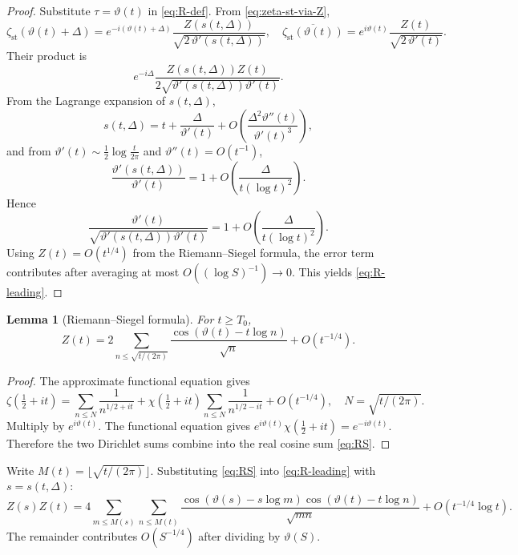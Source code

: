 \documentclass[11pt]{article}
\numberwithin{equation}{section}
\theoremstyle{plain}
\newtheorem{lemma}[theorem]{Lemma}
\theoremstyle{definition}
\begin{document}
\begin{proof}
Substitute \(\tau=\vartheta(t)\) in \eqref{eq:R-def}. From \eqref{eq:zeta-st-via-Z},
\[
\zeta_{\mathrm{st}}(\vartheta(t)+\Delta)
=e^{-i(\vartheta(t)+\Delta)}
\frac{Z(s(t,\Delta))}{\sqrt{2\,\vartheta'(s(t,\Delta))}},
\quad
\overline{\zeta_{\mathrm{st}}(\vartheta(t))}
=e^{i\vartheta(t)}
\frac{Z(t)}{\sqrt{2\,\vartheta'(t)}}.
\]
Their product is
\[
e^{-i\Delta}
\frac{Z(s(t,\Delta))Z(t)}{2\sqrt{\vartheta'(s(t,\Delta))\vartheta'(t)}}.
\]
From the Lagrange expansion of \(s(t,\Delta)\),
\[
s(t,\Delta)=t+\frac{\Delta}{\vartheta'(t)}+O\!\left(\frac{\Delta^2\vartheta''(t)}{\vartheta'(t)^3}\right),
\]
and from \(\vartheta'(t)\sim\frac12\log\frac{t}{2\pi}\) and \(\vartheta''(t)=O(t^{-1})\),
\[
\frac{\vartheta'(s(t,\Delta))}{\vartheta'(t)}=1+O\!\left(\frac{\Delta}{t(\log t)^2}\right).
\]
Hence
\[
\frac{\vartheta'(t)}{\sqrt{\vartheta'(s(t,\Delta))\vartheta'(t)}}
=1+O\!\left(\frac{\Delta}{t(\log t)^2}\right).
\]
Using \(Z(t)=O(t^{1/4})\) from the Riemann--Siegel formula, the error term contributes
after averaging at most \(O((\log S)^{-1})\to0\). This yields \eqref{eq:R-leading}.
\end{proof}

\begin{lemma}[Riemann--Siegel formula]
For \(t\ge T_0\),
\begin{equation}
Z(t)
=
2\sum_{n\le \sqrt{t/(2\pi)}}
\frac{\cos(\vartheta(t)-t\log n)}{\sqrt{n}}
+O(t^{-1/4}).
\label{eq:RS}
\end{equation}
\end{lemma}

\begin{proof}
The approximate functional equation gives
\[
\zeta\!\left(\tfrac12+it\right)
=\sum_{n\le N}\frac{1}{n^{1/2+it}}
+\chi\!\left(\tfrac12+it\right)\sum_{n\le N}\frac{1}{n^{1/2-it}}
+O(t^{-1/4}),
\quad N=\sqrt{t/(2\pi)}.
\]
Multiply by \(e^{i\vartheta(t)}\). The functional equation gives
\(e^{i\vartheta(t)}\chi(\frac12+it)=e^{-i\vartheta(t)}\). Therefore the two Dirichlet
sums combine into the real cosine sum \eqref{eq:RS}.
\end{proof}

Write \(M(t)=\lfloor\sqrt{t/(2\pi)}\rfloor\). Substituting \eqref{eq:RS} into
\eqref{eq:R-leading} with \(s=s(t,\Delta)\):
\begin{equation}
Z(s)Z(t)
=4\sum_{m\le M(s)}\sum_{n\le M(t)}
\frac{\cos(\vartheta(s)-s\log m)\cos(\vartheta(t)-t\log n)}{\sqrt{mn}}
+O(t^{-1/4}\log t).
\label{eq:ZZ}
\end{equation}
The remainder contributes \(O(S^{-1/4})\) after dividing by \(\vartheta(S)\).
\end{document}
